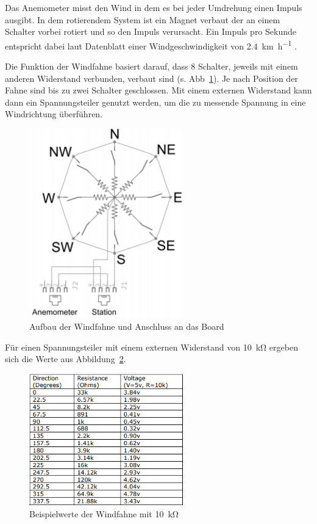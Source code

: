 Das Anemometer misst den Wind in dem es bei jeder Umdrehung einen Impuls ausgibt. In dem rotierendem System ist ein Magnet verbaut der an einem Schalter vorbei rotiert und so den Impuls verursacht. Ein Impuls pro Sekunde entspricht dabei laut Datenblatt einer Windgeschwindigkeit von \SI{2.4}{\km\per\hour} \cite{argent_data_systems}.

Die Funktion der Windfahne basiert darauf, dass 8 Schalter, jeweils mit einem anderen Widerstand verbunden, verbaut sind (s. Abb~\ref{fig:Wind_Plan}). Je nach Position der Fahne sind bis zu zwei Schalter geschlossen. Mit einem externen Widerstand kann dann ein Spannungsteiler genutzt werden, um die zu messende Spannung in eine Windrichtung überführen. 

\begin{figure}[H]
  \centering
  \includegraphics[width=0.6\textwidth]{./img/Wind_Plan.png}
  \caption{Aufbau der Windfahne und Anschluss an das Board}\label{fig:Wind_Plan}
\end{figure}

Für einen Spannungsteiler mit einem externen Widerstand von \SI{10}{\kilo\ohm} ergeben sich die Werte aus Abbildung~\ref{fig:Wind_Werte}.

\begin{figure}[H]
  \centering
  \includegraphics[width=0.6\textwidth]{./img/Wind_Werte.png}
  \caption{Beispielwerte der Windfahne mit \SI{10}{\kilo\ohm} \citep{argent_data_systems}}\label{fig:Wind_Werte}
\end{figure}

